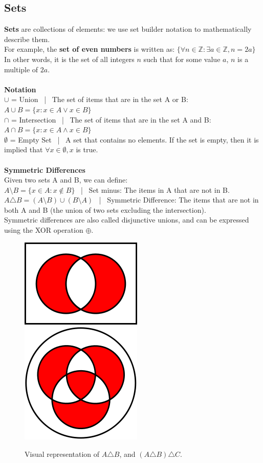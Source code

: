 \documentclass{article}
\begin{document}
\subsection{Sets}
\textbf{Sets} are collections of elements: we use set builder notation to mathematically describe them.\\
For example, the \textbf{set of even numbers} is written as:
$\{ \forall n \in \mathbb{Z} : \exists a \in \mathbb{Z}, n = 2a \}$\\
In other words, it is the set of all integers $n$ such that for some value $a$, $n$ is a multiple of $2a$.\\
\\
\textbf{Notation}\\
$\cup$ = Union \ | \ The set of items that are in the set A or B: $A \cup B = \{x : x \in A \lor x \in B \}$\\
$\cap$ = Intersection \ | \ The set of items that are in the set A and B: $A \cap B = \{x : x \in A \land x \in B \}$\\
$\emptyset$ = Empty Set \ | \ A set that contains no elements. If the set is empty, then it is implied that $\forall x \in \emptyset, x$ is true.
\\
\\
\textbf{Symmetric Differences}\\
Given two sets A and B, we can define:\\
$A \setminus B = \{ x \in A : x \not \in B \}$ \ | \ Set minus: The items in A that are not in B.\\
$A \triangle B = (A \setminus B) \cup (B \setminus A)$ \ | \ Symmetric Difference: The items that are not in both A and B (the union of two sets excluding the intersection).\\
Symmetric differences are also called disjunctive unions, and can be expressed using the XOR operation $\oplus$.
\begin{figure}[h]
    \centering
    \includegraphics[scale=0.4]{imgs/xor1.png}
    \includegraphics[scale=0.31]{imgs/xor2.png}
    \caption{Visual representation of $A \triangle B$, and $(A \triangle B)\triangle C$.}
\end{figure}
\end{document}
